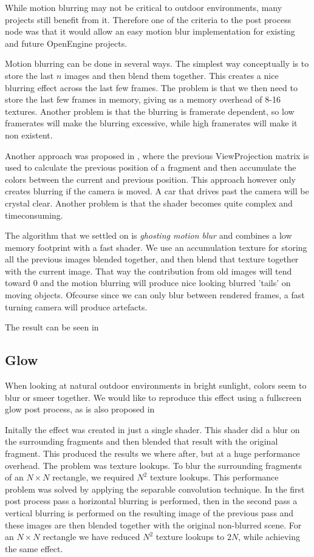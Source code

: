 While motion blurring may not be critical to outdoor environments,
many projects still benefit from it. Therefore one of the criteria
to the post process node was that it would allow an easy motion blur
implementation for existing and future OpenEngine projects.

Motion blurring can be done in several ways. The simplest way
conceptually is to store the last $n$ images and then blend them
together. This creates a nice blurring effect across the last few
frames. The problem is that we then need to store the last few frames
in memory, giving us a memory overhead of 8-16 textures. Another
problem is that the blurring is framerate dependent, so low framerates
will make the blurring excessive, while high framerates will make it
non existent.

Another approach was proposed in , where
the previous ViewProjection matrix is used to calculate the previous
position of a fragment and then accumulate the colors between the
current and previous position. This approach however only creates
blurring if the camera is moved. A car that drives past the camera
will be crystal clear. Another problem is that the shader becomes
quite complex and timeconsuming.

The algorithm that we settled on is \emph{ghosting motion blur} and
combines a low memory footprint with a fast shader. We use an
accumulation texture for storing all the previous images blended
together, and then blend that texture together with the current
image. That way the contribution from old images will tend toward 0
and the motion blurring will produce nice looking blurred 'tails' on
moving objects. Ofcourse since we can only blur between rendered
frames, a fast turning camera will produce artefacts.

The result can be seen in 

\subsection{Glow}

When looking at natural outdoor environments in bright sunlight,
colors seem to blur or smeer together. We would like to reproduce this
effect using a fullscreen glow post process, as is also proposed in

Initally the effect was created in just a single shader. This shader
did a blur on the surrounding fragments and then blended that result
with the original fragment. This produced the results we where after,
but at a huge performance overhead. The problem was texture
lookups. To blur the surrounding fragments of an $N \times N$
rectangle, we required $N^2$ texture lookups. This performance problem
was solved by applying the separable convolution technique. In the
first post process pass a horizontal blurring is performed, then in
the second pass a vertical blurring is performed on the resulting
image of the previous pass and these images are then blended together
with the original non-blurred scene. For an $N \times N$ rectangle we
have reduced $N^2$ texture lookups to $2N$, while achieving the same
effect.


